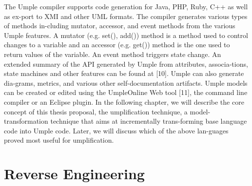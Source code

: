 The Umple compiler supports code generation for Java, PHP, Ruby, C++ as well as ex-port to XMI and other UML formats. The compiler generates various types of methods in-cluding mutator, accessor, and event methods from the various Umple features. A mutator (e.g. set(), add()) method is a method used to control changes to a variable and an accessor (e.g. get()) method is the one used to return values of the variable. An event method triggers state change. An extended summary of the API generated by Umple from attributes, associa-tions, state machines and other features can be found at [10]. Umple can also generate dia-grams, metrics, and various other self-documentation artifacts. Umple models can be created or edited using the UmpleOnline Web tool [11], the command line compiler or an Eclipse plugin. 
In the following chapter, we will describe the core concept of this thesis proposal, the umplification technique, a model-transformation technique that aims at incrementally trans-forming base language code into Umple code. Later, we will discuss which of the above lan-guages proved most useful for umplification.


\section{Reverse Engineering}